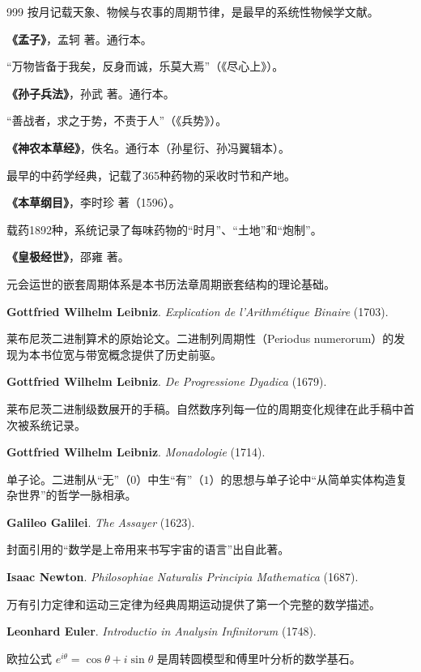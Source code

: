 \begin{thebibliography}{999}
按月记载天象、物候与农事的周期节律，是最早的系统性物候学文献。

 \textbf{《孟子》}，孟轲 著。通行本。

“万物皆备于我矣，反身而诚，乐莫大焉”（《尽心上》）。

 \textbf{《孙子兵法》}，孙武 著。通行本。

“善战者，求之于势，不责于人”（《兵势》）。

 \textbf{《神农本草经》}，佚名。通行本（孙星衍、孙冯翼辑本）。

最早的中药学经典，记载了365种药物的采收时节和产地。

 \textbf{《本草纲目》}，李时珍 著（1596）。

载药1892种，系统记录了每味药物的“时月”、“土地”和“炮制”。

 \textbf{《皇极经世》}，邵雍 著。

元会运世的嵌套周期体系是本书历法章周期嵌套结构的理论基础。

 \textbf{Gottfried Wilhelm Leibniz}. \textit{Explication de l'Arithm\'etique Binaire} (1703).

莱布尼茨二进制算术的原始论文。二进制列周期性（Periodus numerorum）的发现为本书位宽与带宽概念提供了历史前驱。

 \textbf{Gottfried Wilhelm Leibniz}. \textit{De Progressione Dyadica} (1679).

莱布尼茨二进制级数展开的手稿。自然数序列每一位的周期变化规律在此手稿中首次被系统记录。

 \textbf{Gottfried Wilhelm Leibniz}. \textit{Monadologie} (1714).

单子论。二进制从“无”（$0$）中生“有”（$1$）的思想与单子论中“从简单实体构造复杂世界”的哲学一脉相承。

 \textbf{Galileo Galilei}. \textit{The Assayer} (1623).

封面引用的“数学是上帝用来书写宇宙的语言”出自此著。

 \textbf{Isaac Newton}. \textit{Philosophiae Naturalis Principia Mathematica} (1687).

万有引力定律和运动三定律为经典周期运动提供了第一个完整的数学描述。

 \textbf{Leonhard Euler}. \textit{Introductio in Analysin Infinitorum} (1748).

欧拉公式 $e^{i\theta} = \cos\theta + i\sin\theta$ 是周转圆模型和傅里叶分析的数学基石。


\end{thebibliography}
